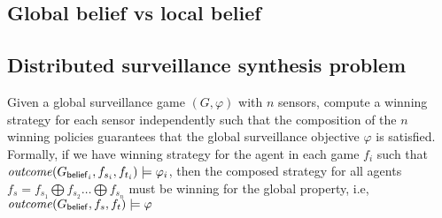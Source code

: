  

\subsection{Global belief vs local belief}


\subsection{Distributed surveillance synthesis problem}
Given a global surveillance game $(G,\varphi)$ with $n$ sensors, compute a winning strategy for each sensor independently such that the composition of the $n$ winning policies guarantees that the global surveillance objective $\varphi$ is satisfied. Formally, if we have winning strategy for the agent in each game $f_i$ such that $\mathit{outcome}(G_{\mathsf{belief}_i},f_{s_i},f_{t_i}) \models \varphi_i$, then the composed strategy for all agents $f_s = f_{s_1} \bigoplus f_{s_2} \dots \bigoplus f_{s_n}$ must be winning for the global property, i.e, $\mathit{outcome}(G_{\mathsf{belief}},f_{s},f_{t}) \models \varphi$





